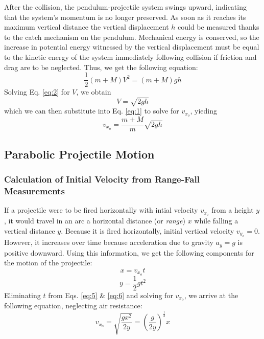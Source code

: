 \documentclass[11pt, titlepage]{article}
\begin{document}
After the collision, the pendulum-projectile system swings upward, indicating that the system's momentum is no longer preserved. As soon as it reaches its maximum vertical distance the vertical displacement $h$ could be measured thanks to the catch mechanism on the pendulum. Mechanical energy is conserved, so the increase in potential energy witnessed by the vertical displacement must be equal to the kinetic energy of the system immediately following collision if friction and drag are to be neglected. Thus, we get the following equation:
\begin{equation} \label{eq:2}
\frac{1}{2}(m+M)V^2 = (m+M)gh
\end{equation}
Solving Eq. \ref{eq:2} for $V$, we obtain
\begin{equation} \label{eq:3}
V = \sqrt{2gh}
\end{equation}
which we can then substitute into Eq. \ref{eq:1} to solve for $v_{x_o}$, yieding
\begin{equation} \label{eq:4}
v_{x_o} = \frac{m+M}{m}\sqrt{2gh}
\end{equation}

\subsection*{Parabolic Projectile Motion}
\subsubsection*{Calculation of Initial Velocity from Range-Fall Measurements}
If a projectile were to be fired horizontally with intial velocity $v_{x_o}$ from a height $y$, it would travel in an arc a horizontal distance (or \emph{range}) $x$ while falling a vertical distance $y$. Because it is fired horizontally, initial vertical velocity  $v_{y_o} = 0$. However, it increases over time because acceleration due to gravity $a_y = g$ is positive downward. Using this information, we get the following components for the motion of the projectile:
\begin{equation} \label{eq:5}
x = v_{x_o}t
\end{equation}
\begin{equation} \label{eq:6}
y = \frac{1}{2}gt^2
\end{equation}
Eliminating $t$ from Eqs. \ref{eq:5} \& \ref{eq:6} and solving for $v_{x_o}$, we arrive at the following equation, neglecting air resistance:
\begin{equation} \label{eq:7}
v_{x_o} = \sqrt{\frac{gx^2}{2y}} = (\frac{g}{2y})^\frac{1}{2}x
 \end{equation}
 
\end{document}
